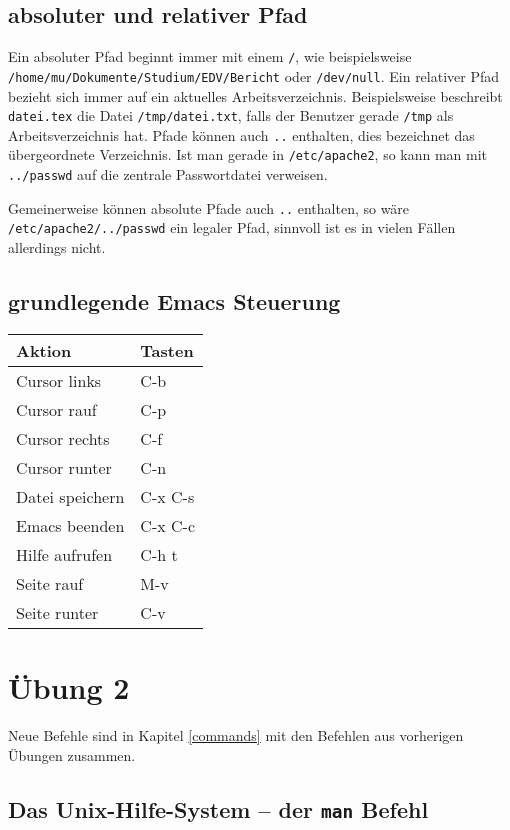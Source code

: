 \documentclass[10pt]{article}
\begin{document}
\subsection{absoluter und relativer Pfad}

Ein absoluter Pfad beginnt immer mit einem \texttt{/}, wie beispielsweise \\ \texttt{/home/mu/Dokumente/Studium/EDV/Bericht} oder \texttt{/dev/null}. Ein relativer Pfad bezieht sich immer auf ein aktuelles Arbeitsverzeichnis. Beispielsweise beschreibt \texttt{datei.tex} die Datei \texttt{/tmp/datei.txt}, falls der Benutzer gerade \texttt{/tmp} als Arbeitsverzeichnis hat. Pfade können auch \texttt{..} enthalten, dies bezeichnet das übergeordnete Verzeichnis. Ist man gerade in \texttt{/etc/apache2}, so kann man mit \texttt{../passwd} auf die zentrale Passwortdatei verweisen.

Gemeinerweise können absolute Pfade auch \texttt{..} enthalten, so wäre \\
\texttt{/etc/apache2/../passwd} ein legaler Pfad, sinnvoll ist es in vielen Fällen allerdings nicht.

\subsection{grundlegende Emacs Steuerung}

\begin{tabular}{ll}
Aktion & Tasten \\
\hline
Cursor links & C-b \\
Cursor rauf & C-p \\
Cursor rechts & C-f \\
Cursor runter & C-n \\
Datei speichern & C-x C-s \\
Emacs beenden & C-x C-c \\
Hilfe aufrufen & C-h t \\
Seite rauf & M-v \\
Seite runter & C-v \\
\end{tabular}

\section{Übung 2}

Neue Befehle sind in Kapitel \ref{commands} mit den Befehlen aus vorherigen Übungen zusammen.

\subsection{Das Unix-Hilfe-System -- der \texttt{man} Befehl}
\end{document}
